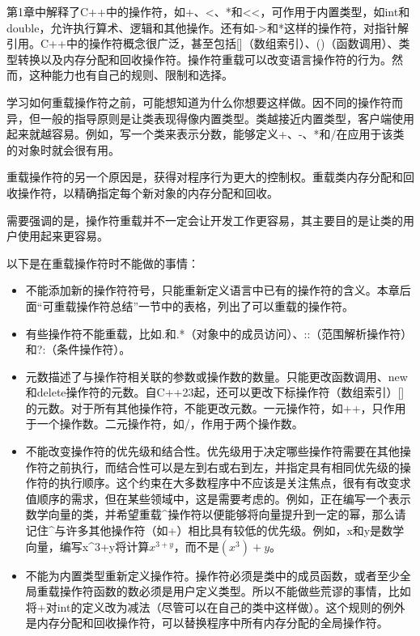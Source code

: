 
第1章中解释了C++中的操作符，如+、<、*和<{}<，可作用于内置类型，如int和double，允许执行算术、逻辑和其他操作。还有如->和*这样的操作符，对指针解引用。C++中的操作符概念很广泛，甚至包括[]（数组索引）、()（函数调用）、类型转换以及内存分配和回收操作符。操作符重载可以改变语言操作符的行为。然而，这种能力也有自己的规则、限制和选择。


学习如何重载操作符之前，可能想知道为什么你想要这样做。因不同的操作符而异，但一般的指导原则是让类表现得像内置类型。类越接近内置类型，客户端使用起来就越容易。例如，写一个类来表示分数，能够定义+、-、*和/在应用于该类的对象时就会很有用。

重载操作符的另一个原因是，获得对程序行为更大的控制权。重载类内存分配和回收操作符，以精确指定每个新对象的内存分配和回收。

需要强调的是，操作符重载并不一定会让开发工作更容易，其主要目的是让类的用户使用起来更容易。


以下是在重载操作符时不能做的事情：

\begin{itemize}
\item
不能添加新的操作符符号，只能重新定义语言中已有的操作符的含义。本章后面“可重载操作符总结”一节中的表格，列出了可以重载的操作符。

\item
有些操作符不能重载，比如.和.*（对象中的成员访问）、::（范围解析操作符）和?:（条件操作符）。

\item
元数描述了与操作符相关联的参数或操作数的数量。只能更改函数调用、new和delete操作符的元数。自C++23起，还可以更改下标操作符（数组索引）[]的元数。对于所有其他操作符，不能更改元数。一元操作符，如++，只作用于一个操作数。二元操作符，如/，作用于两个操作数。

\item
不能改变操作符的优先级和结合性。优先级用于决定哪些操作符需要在其他操作符之前执行，而结合性可以是左到右或右到左，并指定具有相同优先级的操作符的执行顺序。这个约束在大多数程序中不应该是关注焦点，很有有改变求值顺序的需求，但在某些领域中，这是需要考虑的。例如，正在编写一个表示数学向量的类，并希望重载\^{}操作符以便能够将向量提升到一定的幂，那么请记住\^{}与许多其他操作符（如+）相比具有较低的优先级。例如，x和y是数学向量，编写x\^{}3+y将计算$x^{3+y}$，而不是$(x^3)+y$。

\item
不能为内置类型重新定义操作符。操作符必须是类中的成员函数，或者至少全局重载操作符函数的数必须是用户定义类型。所以不能做些荒谬的事情，比如将+对int的定义改为减法（尽管可以在自己的类中这样做）。这个规则的例外是内存分配和回收操作符，可以替换程序中所有内存分配的全局操作符。
\end{itemize}

